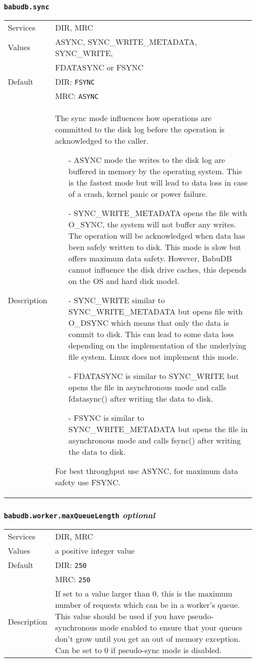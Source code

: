 \documentclass[a4paper,10pt]{book}
\begin{document}
\subsubsection{\texttt{babudb.sync}}
\begin{tabular}{lp{10cm}}
 Services & DIR, MRC\\
 Values   & ASYNC, SYNC\_WRITE\_METADATA, SYNC\_WRITE,\\
	      & FDATASYNC or FSYNC\\
 Default  & DIR: \texttt{FSYNC}\\
          & MRC: \texttt{ASYNC}\\
 Description & The sync mode influences how operations are committed to the disk log before the operation is acknowledged to the caller.
\begin{itemize}
 \item[-]ASYNC mode the writes to the disk log are buffered in memory by the operating system. This is the fastest mode but will lead to data loss in case of a crash, kernel panic or power failure.
 \item[-]SYNC\_WRITE\_METADATA opens the file with O\_SYNC, the system will not buffer any writes. The operation will be acknowledged when data has been safely written to disk. This mode is slow but offers maximum data safety. However, BabuDB cannot influence the disk drive caches, this depends on the OS and hard disk model.
 \item[-]SYNC\_WRITE similar to SYNC\_WRITE\_METADATA but opens file with O\_DSYNC which means that only the data is commit to disk. This can lead to some data loss depending on the implementation of the underlying file system. Linux does not implement this mode.
 \item[-]FDATASYNC is similar to SYNC\_WRITE but opens the file in asynchronous mode and calls fdatasync() after writing the data to disk.
 \item[-]FSYNC is similar to SYNC\_WRITE\_METADATA but opens the file in asynchronous mode and calls fsync() after writing the data to disk.
\end{itemize}
For best throughput use ASYNC, for maximum data safety use FSYNC.
\end{tabular}

\subsubsection{\texttt{babudb.worker.maxQueueLength} \textit{optional}}
\begin{tabular}{lp{10cm}}
 Services & DIR, MRC\\
 Values   & a positive integer value\\
 Default  & DIR: \texttt{250}\\
          & MRC: \texttt{250}\\
 Description & If set to a value larger than 0, this is the maximum number of requests which can be in a worker's queue. This value should be used if you have pseudo-synchronous mode enabled to ensure that your queues don't grow until you get an out of memory exception. Can be set to 0 if pseudo-sync mode is disabled.
\end{tabular}
\end{document}

